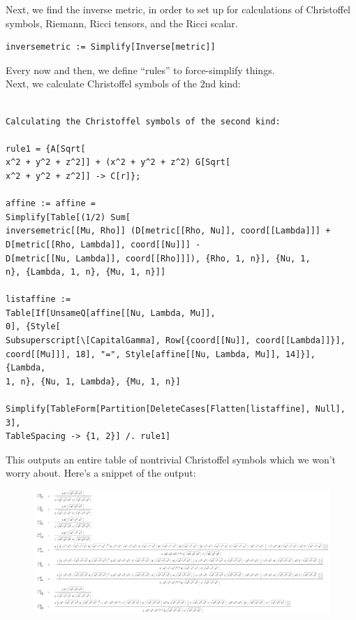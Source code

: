 \documentclass{book}
\theoremstyle{definition}
\begin{document}
Next, we find the inverse metric, in order to set up for calculations of Christoffel symbols, Riemann, Ricci tensors, and the Ricci scalar. 
\begin{lstlisting}
inversemetric := Simplify[Inverse[metric]]
\end{lstlisting}
Every now and then, we define ``rules''  to force-simplify things. \\

Next, we calculate Christoffel symbols of the 2nd kind:
\begin{lstlisting}

Calculating the Christoffel symbols of the second kind: 

rule1 = {A[Sqrt[
x^2 + y^2 + z^2]] + (x^2 + y^2 + z^2) G[Sqrt[
x^2 + y^2 + z^2]] -> C[r]};

affine := affine = 
Simplify[Table[(1/2) Sum[
inversemetric[[Mu, Rho]] (D[metric[[Rho, Nu]], coord[[Lambda]]] + 
D[metric[[Rho, Lambda]], coord[[Nu]]] - 
D[metric[[Nu, Lambda]], coord[[Rho]]]), {Rho, 1, n}], {Nu, 1, 
n}, {Lambda, 1, n}, {Mu, 1, n}]]

listaffine := 
Table[If[UnsameQ[affine[[Nu, Lambda, Mu]], 
0], {Style[
Subsuperscript[\[CapitalGamma], Row[{coord[[Nu]], coord[[Lambda]]}], 
coord[[Mu]]], 18], "=", Style[affine[[Nu, Lambda, Mu]], 14]}], {Lambda, 
1, n}, {Nu, 1, Lambda}, {Mu, 1, n}]

Simplify[TableForm[Partition[DeleteCases[Flatten[listaffine], Null], 3], 
TableSpacing -> {1, 2}] /. rule1]
\end{lstlisting}

This outputs an entire table of nontrivial Christoffel symbols which we won't worry about. Here's a snippet of the output:
\begin{figure}[!htb]
	\centering
	\includegraphics[scale=0.3]{christoffel}
\end{figure}
\end{document}
